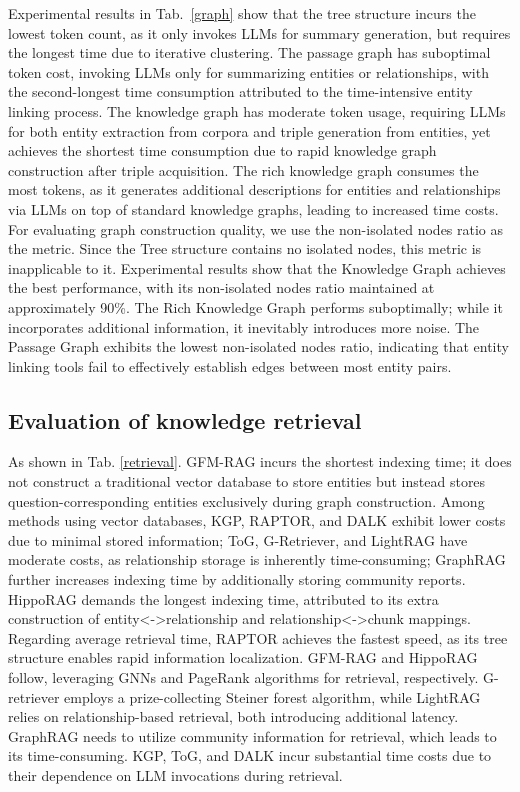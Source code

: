 \documentclass{article}
\begin{document}
Experimental results in Tab.~\ref{graph} show that the tree structure incurs the lowest token count, as it only invokes LLMs for summary generation, but requires the longest time due to iterative clustering. The passage graph has suboptimal token cost, invoking LLMs only for summarizing entities or relationships, with the second-longest time consumption attributed to the time-intensive entity linking process. The knowledge graph has moderate token usage, requiring LLMs for both entity extraction from corpora and triple generation from entities, yet achieves the shortest time consumption due to rapid knowledge graph construction after triple acquisition. The rich knowledge graph consumes the most tokens, as it generates additional descriptions for entities and relationships via LLMs on top of standard knowledge graphs, leading to increased time costs. For evaluating graph construction quality, we use the non-isolated nodes ratio as the metric. Since the Tree structure contains no isolated nodes, this metric is inapplicable to it. Experimental results show that the Knowledge Graph achieves the best performance, with its non-isolated nodes ratio maintained at approximately 90\%. The Rich Knowledge Graph performs suboptimally; while it incorporates additional information, it inevitably introduces more noise. The Passage Graph exhibits the lowest non-isolated nodes ratio, indicating that entity linking tools fail to effectively establish edges between most entity pairs.

\subsection{Evaluation of knowledge retrieval}

As shown in Tab. \ref{retrieval}. GFM-RAG incurs the shortest indexing time; it does not construct a traditional vector database to store entities but instead stores question-corresponding entities exclusively during graph construction. Among methods using vector databases, KGP, RAPTOR, and DALK exhibit lower costs due to minimal stored information; ToG, G-Retriever, and LightRAG have moderate costs, as relationship storage is inherently time-consuming; GraphRAG further increases indexing time by additionally storing community reports. HippoRAG demands the longest indexing time, attributed to its extra construction of entity<->relationship and relationship<->chunk mappings.
Regarding average retrieval time, RAPTOR achieves the fastest speed, as its tree structure enables rapid information localization. GFM-RAG and HippoRAG follow, leveraging GNNs and PageRank algorithms for retrieval, respectively. G-retriever employs a prize-collecting Steiner forest algorithm, while LightRAG relies on relationship-based retrieval, both introducing additional latency. GraphRAG needs to utilize community information for retrieval, which leads to its time-consuming. KGP, ToG, and DALK incur substantial time costs due to their dependence on LLM invocations during retrieval.
\end{document}
